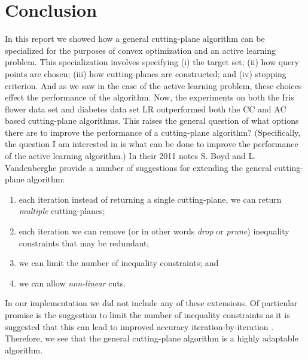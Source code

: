 \documentclass[11pt]{amsart}
\theoremstyle{definition}
\theoremstyle{remark}
\begin{document}
\section{Conclusion}\label{s:conc}
    In this report we showed how a general cutting-plane algorithm can be specialized for the purposes of convex optimization and an active learning problem. This specialization involves specifying (i) the target set; (ii) how query points are chosen; (iii) how cutting-planes are constructed; and (iv) stopping criterion. And as we saw in the case of the active learning problem, these choices effect the performance of the algorithm. Now, the experiments on both the Iris flower data set and diabetes data set LR outperformed both the CC and AC based cutting-plane algorithms. This raises the general question of what options there are to improve the performance of a cutting-plane algorithm? (Specifically, the question I am interested in is what can be done to improve the performance of the active learning algorithm.) In their 2011 notes S. Boyd and L. Vandenberghe \cite[Section 5]{BV11} provide a number of suggestions for extending the general cutting-plane algorithm:
    \begin{enumerate}
        \item each iteration instead of returning a single cutting-plane, we can return \emph{ multiple} cutting-planes;
        \item each iteration we can remove (or in other words \emph{drop} or \emph{prune}) inequality constraints that may be redundant;
        \item we can limit the number of inequality constraints; and
        \item we can allow \emph{non-linear} cuts.
    \end{enumerate}
    In our implementation we did not include any of these extensions. Of particular promise is the suggestion to limit the number of inequality constraints as it is suggested that this can lead to improved accuracy iteration-by-iteration \cite[Section 5]{BV11}. Therefore, we see that the general cutting-plane algorithm is a highly adaptable algorithm.
\end{document}
